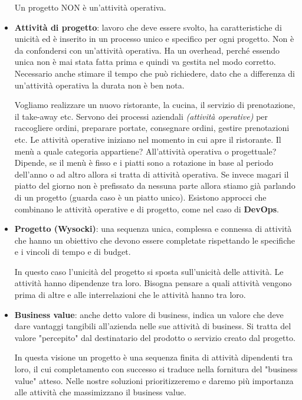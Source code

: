 \begin{itemize}
	\begin{warn}
		Un progetto NON è un'attività operativa.
	\end{warn}
	\item\textbf{Attività di progetto}: lavoro che deve essere svolto, ha caratteristiche di unicità ed è inserito in un processo unico e specifico per ogni progetto. Non è da confondersi con un'attività operativa. Ha un overhead, perché essendo unica non è mai stata fatta prima e quindi va gestita nel modo corretto. Necessario anche stimare il tempo che può richiedere, dato che a differenza di un'attività operativa la durata non è ben nota.
	\begin{info}
		Vogliamo realizzare un nuovo ristorante, la cucina, il servizio di prenotazione, il take-away etc.\newline
		Servono dei processi aziendali \textit{(attività operative)} per raccogliere ordini, preparare portate, consegnare ordini, gestire prenotazioni etc.\newline
		Le attività operative iniziano nel momento in cui apre il ristorante.\newline
		Il menù a quale categoria appartiene? All'attività operativa o progettuale? Dipende, se il menù è fisso e i piatti sono a rotazione in base al periodo dell'anno o ad altro allora si tratta di attività operativa. Se invece magari il piatto del giorno non è prefissato da nessuna parte allora stiamo già parlando di un progetto (guarda caso è un piatto unico).\newline
		Esistono approcci che combinano le attività operative e di progetto, come nel caso di \textbf{DevOps}.
	\end{info}
	\item \textbf{Progetto (Wysocki)}: una sequenza unica, complessa e connessa di attività che hanno un obiettivo che devono essere completate rispettando le specifiche e i vincoli di tempo e di budget.
	\begin{info}
		In questo caso l'unicità del progetto si sposta sull'unicità delle attività. Le attività hanno dipendenze tra loro. Bisogna pensare a quali attività vengono prima di altre e alle interrelazioni che le attività hanno tra loro.
	\end{info}
	\item \textbf{Business value}: anche detto valore di business, indica un valore che deve dare vantaggi tangibili all'azienda nelle sue attività di business. Si tratta del valore "percepito" dal destinatario del prodotto o servizio creato dal progetto.
	\begin{info}
		In questa visione un progetto è una sequenza finita di attività dipendenti tra loro, il cui completamento con successo si traduce nella fornitura del "business value" atteso. Nelle nostre soluzioni prioritizzeremo e daremo più importanza alle attività che massimizzano il business value.
	\end{info}
\end{itemize}
